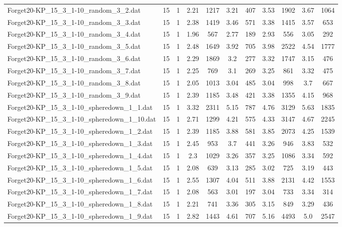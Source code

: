 \begin{table}[!ht]
\begin{tabular}{lcccccccccc}
Forget20-KP\_15\_3\_1-10\_random\_3\_2.dat & 15 & 1 & 2.21 & 1217 & 3.21 & 407 & 3.53 & 1902 & 3.67 & 1064 \\
Forget20-KP\_15\_3\_1-10\_random\_3\_3.dat & 15 & 1 & 2.38 & 1419 & 3.46 & 571 & 3.38 & 1415 & 3.57 & 653 \\
Forget20-KP\_15\_3\_1-10\_random\_3\_4.dat & 15 & 1 & 1.96 & 567 & 2.77 & 189 & 2.93 & 556 & 3.05 & 292 \\
Forget20-KP\_15\_3\_1-10\_random\_3\_5.dat & 15 & 1 & 2.48 & 1649 & 3.92 & 705 & 3.98 & 2522 & 4.54 & 1777 \\
Forget20-KP\_15\_3\_1-10\_random\_3\_6.dat & 15 & 1 & 2.29 & 1869 & 3.2 & 277 & 3.32 & 1747 & 3.15 & 476 \\
Forget20-KP\_15\_3\_1-10\_random\_3\_7.dat & 15 & 1 & 2.25 & 769 & 3.1 & 269 & 3.25 & 861 & 3.32 & 475 \\
Forget20-KP\_15\_3\_1-10\_random\_3\_8.dat & 15 & 1 & 2.05 & 1013 & 3.04 & 485 & 3.04 & 998 & 3.7 & 667 \\
Forget20-KP\_15\_3\_1-10\_random\_3\_9.dat & 15 & 1 & 2.39 & 1185 & 3.48 & 421 & 3.38 & 1355 & 4.15 & 968 \\
Forget20-KP\_15\_3\_1-10\_spheredown\_1\_1.dat & 15 & 1 & 3.32 & 2311 & 5.15 & 787 & 4.76 & 3129 & 5.63 & 1835 \\
Forget20-KP\_15\_3\_1-10\_spheredown\_1\_10.dat & 15 & 1 & 2.71 & 1299 & 4.21 & 575 & 4.33 & 3147 & 4.67 & 2245 \\
Forget20-KP\_15\_3\_1-10\_spheredown\_1\_2.dat & 15 & 1 & 2.39 & 1185 & 3.88 & 581 & 3.85 & 2073 & 4.25 & 1539 \\
Forget20-KP\_15\_3\_1-10\_spheredown\_1\_3.dat & 15 & 1 & 2.45 & 953 & 3.7 & 441 & 3.26 & 946 & 3.83 & 532 \\
Forget20-KP\_15\_3\_1-10\_spheredown\_1\_4.dat & 15 & 1 & 2.3 & 1029 & 3.26 & 357 & 3.25 & 1086 & 3.34 & 592 \\
Forget20-KP\_15\_3\_1-10\_spheredown\_1\_5.dat & 15 & 1 & 2.08 & 639 & 3.13 & 285 & 3.02 & 725 & 3.19 & 443 \\
Forget20-KP\_15\_3\_1-10\_spheredown\_1\_6.dat & 15 & 1 & 2.55 & 1307 & 4.04 & 511 & 3.88 & 2131 & 4.42 & 1553 \\
Forget20-KP\_15\_3\_1-10\_spheredown\_1\_7.dat & 15 & 1 & 2.08 & 563 & 3.01 & 197 & 3.04 & 733 & 3.34 & 314 \\
Forget20-KP\_15\_3\_1-10\_spheredown\_1\_8.dat & 15 & 1 & 2.21 & 741 & 3.36 & 305 & 3.15 & 849 & 3.29 & 436 \\
Forget20-KP\_15\_3\_1-10\_spheredown\_1\_9.dat & 15 & 1 & 2.82 & 1443 & 4.61 & 707 & 5.16 & 4493 & 5.0 & 2547 \\

\end{tabular}
\end{table}
